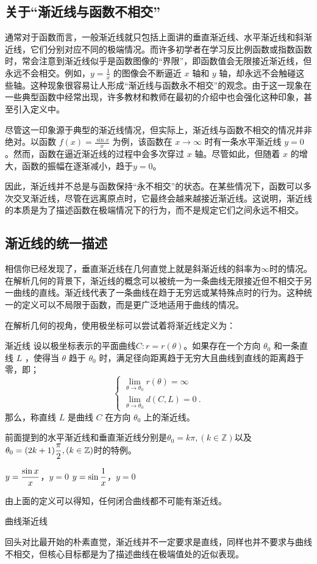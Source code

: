 \subsection{关于“渐近线与函数不相交”}

通常对于函数而言，一般渐近线就只包括上面讲的垂直渐近线、水平渐近线和斜渐近线，它们分别对应不同的极端情况。而许多初学者在学习反比例函数或指数函数时，常会注意到渐近线似乎是函数图像的“界限”，即函数值会无限接近渐近线，但永远不会相交。例如，$\displaystyle y = \frac{1}{x}$ 的图像会不断逼近 $x$ 轴和 $y$ 轴，却永远不会触碰这些轴。这种现象很容易让人形成“渐近线与函数永不相交”的观念。由于这一现象在一些典型函数中经常出现，许多教材和教师在最初的介绍中也会强化这种印象，甚至引入定义中。

尽管这一印象源于典型的渐近线情况，但实际上，渐近线与函数不相交的情况并非绝对。以函数 $\displaystyle f(x) = \frac{\sin x}{x}$ 为例，该函数在 $x \to \infty$ 时有一条水平渐近线 $y = 0$。然而，函数在逼近渐近线的过程中会多次穿过 $x$ 轴。尽管如此，但随着 $x$ 的增大，函数的振幅在逐渐减小，趋于$y = 0$。

因此，渐近线并不总是与函数保持“永不相交”的状态。在某些情况下，函数可以多次交叉渐近线，尽管在远离原点时，它最终会越来越接近渐近线。这说明，渐近线的本质是为了描述函数在极端情况下的行为，而不是规定它们之间永远不相交。

\subsection{渐近线的统一描述}

相信你已经发现了，垂直渐近线在几何直觉上就是斜渐近线的斜率为$\infty$时的情况。在解析几何的背景下，渐近线的概念可以被统一为一条曲线无限接近但不相交于另一曲线的直线。渐近线代表了一条曲线在趋于无穷远或某特殊点时的行为。这种统一的定义可以不局限于函数，而是更广泛地适用于曲线的情况。

在解析几何的视角，使用极坐标可以尝试着将渐近线定义为：

\begin{definition}{渐近线}
设以极坐标表示的平面曲线$C:r=r(\theta)$。如果存在一个方向  $\theta_0$  和一条直线  $L$ ，使得当  $\theta$  趋于  $\theta_0$  时，满足径向距离趋于无穷大且曲线到直线的距离趋于零，即；
\begin{equation}
\begin{cases}
\displaystyle\lim_{\theta \to \theta_0} r(\theta) = \infty\\
\displaystyle\lim_{\theta \to \theta_0} d(C, L) = 0~.
\end{cases}
\end{equation}
那么，称直线  $L$  是曲线  $C$  在方向  $\theta_0$  上的渐近线。
\end{definition}

前面提到的水平渐近线和垂直渐近线分别是$\theta_0=k\pi,(k\in\mathbb{Z})$以及$\displaystyle\theta_0=(2k+1){\pi\over2},(k\in\mathbb{Z})$时的特例。

$\displaystyle y={\sin x\over x}$，$y=0$
$\displaystyle y=\sin {1\over x}$，$y=0$

由上面的定义可以得知，任何闭合曲线都不可能有渐近线。

曲线渐近线

回头对比最开始的朴素直觉，渐近线并不一定要求是直线，同样也并不要求与曲线不相交，但核心目标都是为了描述曲线在极端值处的近似表现。